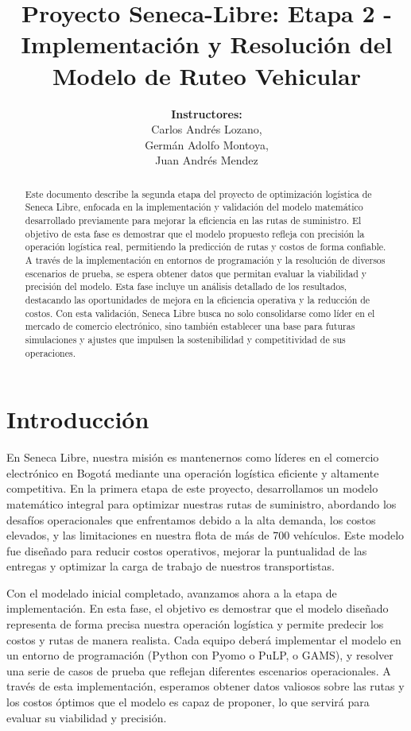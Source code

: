 \documentclass[12pt]{article}
\title{Proyecto Seneca-Libre: Etapa 2 - Implementación y Resolución del Modelo de Ruteo Vehicular}
\author{\textbf{Instructores:} \\
Carlos Andrés Lozano, \\
Germán Adolfo Montoya, \\
Juan Andrés Mendez}
\date{}
\begin{document}
\maketitle

\begin{abstract}
Este documento describe la segunda etapa del proyecto de optimización logística de Seneca Libre, enfocada en la implementación y validación del modelo matemático desarrollado previamente para mejorar la eficiencia en las rutas de suministro. El objetivo de esta fase es demostrar que el modelo propuesto refleja con precisión la operación logística real, permitiendo la predicción de rutas y costos de forma confiable. A través de la implementación en entornos de programación y la resolución de diversos escenarios de prueba, se espera obtener datos que permitan evaluar la viabilidad y precisión del modelo. Esta fase incluye un análisis detallado de los resultados, destacando las oportunidades de mejora en la eficiencia operativa y la reducción de costos. Con esta validación, Seneca Libre busca no solo consolidarse como líder en el mercado de comercio electrónico, sino también establecer una base para futuras simulaciones y ajustes que impulsen la sostenibilidad y competitividad de sus operaciones.
\end{abstract}

\section{Introducción}
En Seneca Libre, nuestra misión es mantenernos como líderes en el comercio electrónico en Bogotá mediante una operación logística eficiente y altamente competitiva. En la primera etapa de este proyecto, desarrollamos un modelo matemático integral para optimizar nuestras rutas de suministro, abordando los desafíos operacionales que enfrentamos debido a la alta demanda, los costos elevados, y las limitaciones en nuestra flota de más de 700 vehículos. Este modelo fue diseñado para reducir costos operativos, mejorar la puntualidad de las entregas y optimizar la carga de trabajo de nuestros transportistas.

Con el modelado inicial completado, avanzamos ahora a la etapa de implementación. En esta fase, el objetivo es demostrar que el modelo diseñado representa de forma precisa nuestra operación logística y permite predecir los costos y rutas de manera realista. Cada equipo deberá implementar el modelo en un entorno de programación (Python con Pyomo o PuLP, o GAMS), y resolver una serie de casos de prueba que reflejan diferentes escenarios operacionales. A través de esta implementación, esperamos obtener datos valiosos sobre las rutas y los costos óptimos que el modelo es capaz de proponer, lo que servirá para evaluar su viabilidad y precisión.
\end{document}
